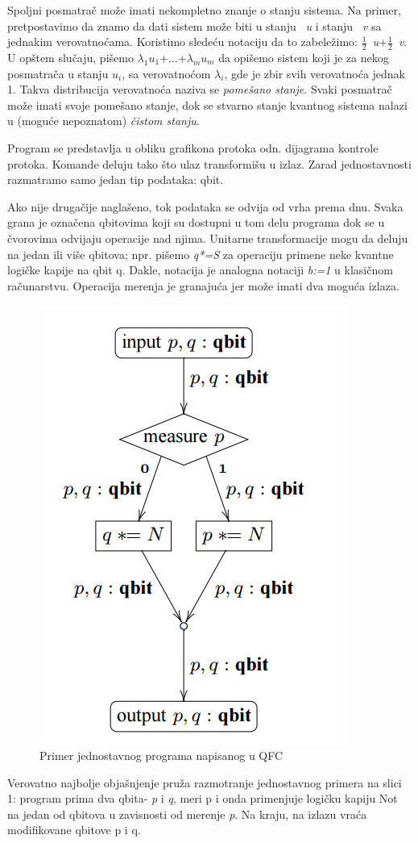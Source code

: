 \documentclass[a4paper]{article}
\begin{document}
{Spoljni posmatrač može imati nekompletno znanje o stanju sistema. Na primer, pretpostavimo da znamo da dati sistem može biti u stanju ~\emph{u} i stanju ~\emph{v} sa jednakim verovatnoćama. Koristimo sledeću notaciju da to zabeležimo: \( \frac{1}{2} \){~\emph{u}}+\( \frac{1}{2} \){~\emph{v}}. U opštem slučaju, pišemo $\lambda_1${$u_1$}+$\ldots$+$\lambda_m${$u_m$} da opišemo sistem koji je za nekog posmatrača u stanju $u_i$, sa verovatnoćom $\lambda_i$, gde je zbir svih verovatnoća jednak 1. Takva distribucija verovatnoća naziva se \textit{pomešano stanje}. Svaki posmatrač može imati svoje pomešano stanje, dok se stvarno stanje kvantnog sistema nalazi u (moguće nepoznatom) \textit{čistom stanju}.

Program se predstavlja u obliku grafikona protoka odn. dijagrama kontrole protoka. Komande deluju tako što ulaz transformišu u izlaz. Zarad jednostavnosti razmatramo samo jedan tip podataka: qbit.

Ako nije drugačije naglašeno, tok podataka se odvija od vrha prema dnu. Svaka grana je označena qbitovima koji su dostupni u tom delu programa dok se u čvorovima odvijaju operacije nad njima. Unitarne transformacije mogu da deluju na jedan ili više qbitova; npr. pišemo \textit{q*=S} za operaciju primene neke kvantne logičke kapije na qbit q. Dakle, notacija je analogna notaciji \textit{b:=1} u klasičnom računarstvu. Operacija merenja je granajuća jer može imati dva moguća izlaza.
\begin{figure}[H]
\caption{Primer jednostavnog programa napisanog u QFC}
\centering
\includegraphics[scale=0.75]{qFlow}
\end{figure}
Verovatno najbolje objašnjenje pruža razmotranje jednostavnog primera na slici 1: program prima dva qbita- \textit{p} i \textit{q}, meri p i onda primenjuje logičku kapiju Not na jedan od qbitova u zavisnosti od merenje \textit{p}. Na kraju, na izlazu vraća modifikovane qbitove p i q.

}
\end{document}
